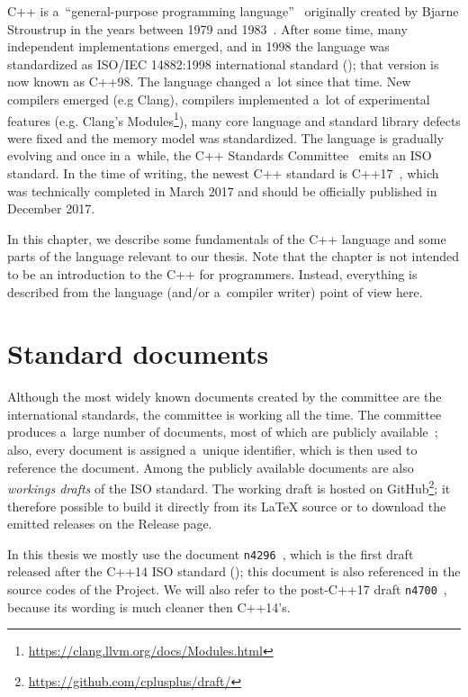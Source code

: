 \documentclass[nolot,nolof,nocover,printed]{fithesis3}
\newcommand{\Project}{Project\xspace}
\begin{document}
C++ is a~\enquote{general-purpose programming language}~\cite{bjarne-cpp} originally created by Bjarne Stroustrup in the years between 1979 and 1983~\cite{bjarne-faq}. After some time, many independent implementations emerged, and in 1998 the language was standardized as ISO/IEC 14882:1998 international standard (\cite{ISOcpp98}); that version is now known as C++98. The language changed a~lot since that time. New compilers emerged (e.g Clang), compilers implemented a~lot of experimental features (e.g. Clang's Modules\footnote{\url{https://clang.llvm.org/docs/Modules.html}}), many core language and standard library defects were fixed and the memory model was standardized. The language is gradually evolving and once in a~while, the C++ Standards Committee~\cite{wg21home} emits an ISO standard. In the time of writing, the newest C++ standard is C++17~\cite{ISOcpp17}, which was technically completed in March 2017 and should be officially published in December 2017.

In this chapter, we describe some fundamentals of the C++ language and some parts of the language relevant to our thesis. Note that the chapter is not intended to be an introduction to the C++ for programmers. Instead, everything is described from the language (and/or a~compiler writer) point of view here.

\section{Standard documents}
Although the most widely known documents created by the committee are the international standards, the committee is working all the time. The committee produces a~large number of documents, most of which are publicly available~\cite{wg21papers}; also, every document is assigned a~unique identifier, which is then used to reference the document. Among the publicly available documents are also \textit{workings drafts} of the ISO standard. The working draft is hosted on GitHub\footnote{\url{https://github.com/cplusplus/draft/}}; it therefore possible to build it directly from its \LaTeX{ }source or to download the emitted releases on the Release page.

In this thesis we mostly use the document \texttt{n4296}~\cite{n4296}, which is the first draft released after the C++14 ISO standard (\cite{ISOcpp14}); this document is also referenced in the source codes of the \Project. We will also refer to the post-C++17 draft \texttt{n4700}~\cite{n4296}, because its wording is much cleaner then C++14's.
\end{document}
